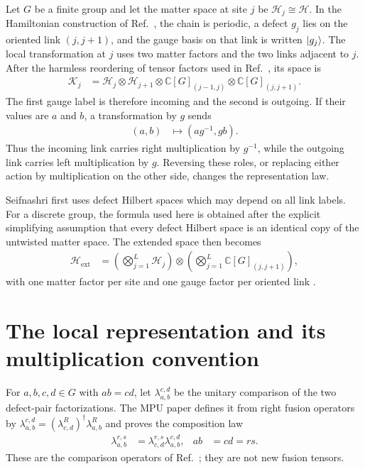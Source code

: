 \documentclass{article}
\begin{document}
Let $G$ be a finite group and let the matter space at site $j$ be
$\mathcal H_j\cong\mathcal H$.  In the Hamiltonian construction of
Ref.~\cite[Section~3.2]{Seifnashri2024LSM}, the chain is periodic, a defect
$g_j$ lies on the oriented link $(j,j+1)$, and the gauge basis on that link is
written $|g_j\rangle$.  The local transformation at $j$ uses two matter factors
and the two links adjacent to $j$.  After the harmless reordering of tensor
factors used in Ref.~\cite[lines~3380--3386]{FrancoRubio2025MPUGauging}, its
space is
\begin{align}
    \mathcal K_j
        &=\mathcal H_j\otimes\mathcal H_{j+1}
          \otimes\mathbb C[G]_{(j-1,j)}
          \otimes\mathbb C[G]_{(j,j+1)}.
    \label{eq:fbc25_gauss_oriented_local_space}
\end{align}
The first gauge label is therefore incoming and the second is outgoing.  If
their values are $a$ and $b$, a transformation by $g$ sends
\begin{align}
    (a,b)&\longmapsto(ag^{-1},gb).
    \label{eq:fbc25_gauss_oriented_link_action}
\end{align}
Thus the incoming link carries right multiplication by $g^{-1}$, while the
outgoing link carries left multiplication by $g$.  Reversing these roles, or
replacing either action by multiplication on the other side, changes the
representation law.

Seifnashri first uses defect Hilbert spaces which may depend on all link
labels.  For a discrete group, the formula used here is obtained after the
explicit simplifying assumption that every defect Hilbert space is an
identical copy of the untwisted matter space.  The extended space then becomes
\begin{align}
    \mathcal H_{\mathrm{ext}}
        &=\left(\bigotimes_{j=1}^{L}\mathcal H_j\right)
          \otimes
          \left(\bigotimes_{j=1}^{L}\mathbb C[G]_{(j,j+1)}\right),
    \label{eq:fbc25_gauss_extended_space}
\end{align}
with one matter factor per site and one gauge factor per oriented link
\cite[Section~3.2, arXiv source lines~1637--1678]{Seifnashri2024LSM}.

\section{The local representation and its multiplication convention}

For $a,b,c,d\in G$ with $ab=cd$, let
$\lambda_{a,b}^{c,d}$ be the unitary comparison of the two defect-pair
factorizations.  The MPU paper defines it from right fusion operators by
$\lambda_{a,b}^{c,d}=(\lambda^R_{c,d})^\dagger\lambda^R_{a,b}$ and proves the
composition law
\begin{align}
    \lambda_{a,b}^{r,s}
        &=\lambda_{c,d}^{r,s}\lambda_{a,b}^{c,d},
        &ab&=cd=rs.
    \label{eq:fbc25_gauss_lambda_composition}
\end{align}
These are the comparison operators of
Ref.~\cite[lines~2782--2821]{FrancoRubio2025MPUGauging}; they are not new
fusion tensors.
\end{document}
